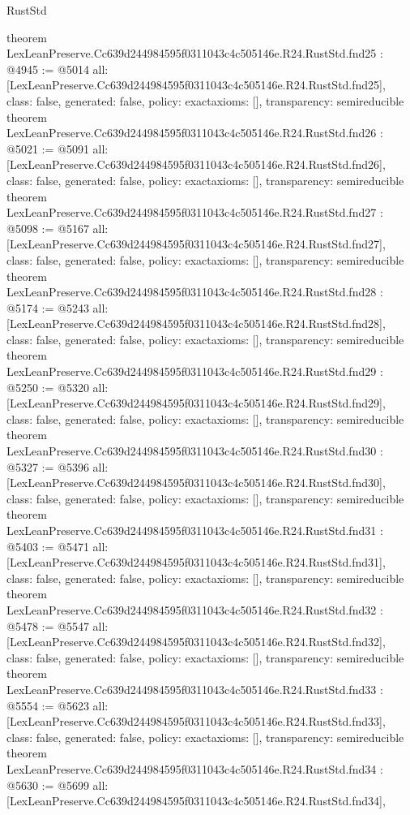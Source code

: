 \begin{lexlean}{RustStd}
\begin{coremodule}
{}
theorem LexLeanPreserve.Cc639d244984595f0311043c4c505146e.R24.RustStd.fnd25 : @4945 := @5014 {
  all: [LexLeanPreserve.Cc639d244984595f0311043c4c505146e.R24.RustStd.fnd25],
  class: false,
  generated: false,
  policy: exact{axioms: []},
  transparency: semireducible
}
theorem LexLeanPreserve.Cc639d244984595f0311043c4c505146e.R24.RustStd.fnd26 : @5021 := @5091 {
  all: [LexLeanPreserve.Cc639d244984595f0311043c4c505146e.R24.RustStd.fnd26],
  class: false,
  generated: false,
  policy: exact{axioms: []},
  transparency: semireducible
}
theorem LexLeanPreserve.Cc639d244984595f0311043c4c505146e.R24.RustStd.fnd27 : @5098 := @5167 {
  all: [LexLeanPreserve.Cc639d244984595f0311043c4c505146e.R24.RustStd.fnd27],
  class: false,
  generated: false,
  policy: exact{axioms: []},
  transparency: semireducible
}
theorem LexLeanPreserve.Cc639d244984595f0311043c4c505146e.R24.RustStd.fnd28 : @5174 := @5243 {
  all: [LexLeanPreserve.Cc639d244984595f0311043c4c505146e.R24.RustStd.fnd28],
  class: false,
  generated: false,
  policy: exact{axioms: []},
  transparency: semireducible
}
theorem LexLeanPreserve.Cc639d244984595f0311043c4c505146e.R24.RustStd.fnd29 : @5250 := @5320 {
  all: [LexLeanPreserve.Cc639d244984595f0311043c4c505146e.R24.RustStd.fnd29],
  class: false,
  generated: false,
  policy: exact{axioms: []},
  transparency: semireducible
}
theorem LexLeanPreserve.Cc639d244984595f0311043c4c505146e.R24.RustStd.fnd30 : @5327 := @5396 {
  all: [LexLeanPreserve.Cc639d244984595f0311043c4c505146e.R24.RustStd.fnd30],
  class: false,
  generated: false,
  policy: exact{axioms: []},
  transparency: semireducible
}
theorem LexLeanPreserve.Cc639d244984595f0311043c4c505146e.R24.RustStd.fnd31 : @5403 := @5471 {
  all: [LexLeanPreserve.Cc639d244984595f0311043c4c505146e.R24.RustStd.fnd31],
  class: false,
  generated: false,
  policy: exact{axioms: []},
  transparency: semireducible
}
theorem LexLeanPreserve.Cc639d244984595f0311043c4c505146e.R24.RustStd.fnd32 : @5478 := @5547 {
  all: [LexLeanPreserve.Cc639d244984595f0311043c4c505146e.R24.RustStd.fnd32],
  class: false,
  generated: false,
  policy: exact{axioms: []},
  transparency: semireducible
}
theorem LexLeanPreserve.Cc639d244984595f0311043c4c505146e.R24.RustStd.fnd33 : @5554 := @5623 {
  all: [LexLeanPreserve.Cc639d244984595f0311043c4c505146e.R24.RustStd.fnd33],
  class: false,
  generated: false,
  policy: exact{axioms: []},
  transparency: semireducible
}
theorem LexLeanPreserve.Cc639d244984595f0311043c4c505146e.R24.RustStd.fnd34 : @5630 := @5699 {
  all: [LexLeanPreserve.Cc639d244984595f0311043c4c505146e.R24.RustStd.fnd34],
}
\end{coremodule}
\end{lexlean}
